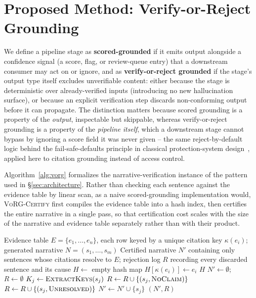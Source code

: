 \documentclass[11pt]{article}
\begin{document}
\section{Proposed Method: Verify-or-Reject Grounding}
\label{sec:method}

We define a pipeline stage as \textbf{scored-grounded} if it emits output alongside a confidence signal (a score, flag, or review-queue entry) that a downstream consumer may act on or ignore, and as \textbf{verify-or-reject grounded} if the stage's output type itself excludes unverifiable content: either because the stage is deterministic over already-verified inputs (introducing no new hallucination surface), or because an explicit verification step discards non-conforming output before it can propagate. The distinction matters because scored grounding is a property of the \emph{output}, inspectable but skippable, whereas verify-or-reject grounding is a property of the \emph{pipeline itself}, which a downstream stage cannot bypass by ignoring a score field it was never given -- the same reject-by-default logic behind the fail-safe-defaults principle in classical protection-system design~\cite{saltzer1975protection}, applied here to citation grounding instead of access control.

Algorithm~\ref{alg:vorg} formalizes the narrative-verification instance of the pattern used in \S\ref{sec:architecture}. Rather than checking each sentence against the evidence table by linear scan, as a naive scored-grounding implementation would, \textsc{VoRG-Certify} first compiles the evidence table into a hash index, then certifies the entire narrative in a single pass, so that certification cost scales with the size of the narrative and evidence table separately rather than with their product.

\label{alg:vorg}
\begin{algorithmic}[1]
\Require Evidence table $E = \{e_1, \dots, e_n\}$, each row keyed by a unique citation key $\kappa(e_i)$; generated narrative $N = (s_1, \dots, s_m)$
\Ensure Certified narrative $N'$ containing only sentences whose citations resolve to $E$; rejection log $R$ recording every discarded sentence and its cause
 \State $H \gets$ empty hash map
 \State $H[\kappa(e_i)] \gets e_i$ 
 \EndFor
 \State \Return $H$
\EndFunction
\Statex
{}
 \State $N' \gets \emptyset$;\ $R \gets \emptyset$
  
 \State $K_j \gets \Call{ExtractKeys}{s_j}$ 
 \State $R \gets R \cup \{(s_j, \textsc{NoClaim})\}$ 
 \State $R \gets R \cup \{(s_j, \textsc{Unresolved})\}$ 
 \Else
 \State $N' \gets N' \cup \{s_j\}$
 \EndIf
 \EndFor
 \State \Return $(N', R)$
\EndFunction
\end{algorithmic}
\end{document}
